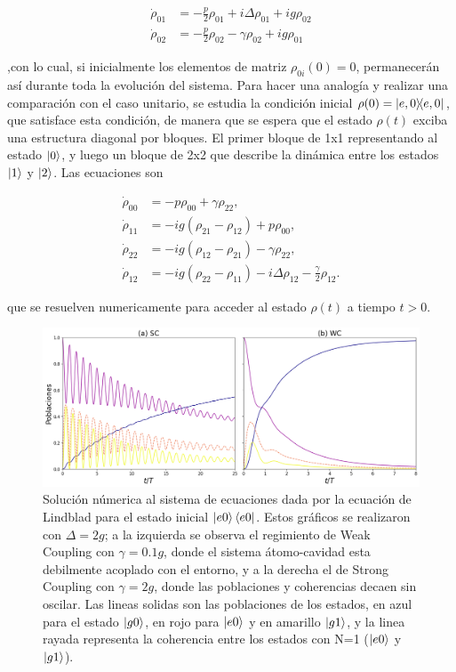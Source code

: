 \begin{equation}
    \begin{aligned}
        \dot \rho_{01} & =-\frac{p}{2} \rho_{01}+i\Delta\rho_{01}+ig\rho_{02} \\
        \dot \rho_{02} & =-\frac{p}{2} \rho_{02}-\gamma \rho_{02}+ig\rho_{01}
    \end{aligned}
\end{equation}

,con lo cual, si inicialmente los elementos de matriz $\rho_{0i}(0)=0$, permanecerán así durante toda la evolución del sistema. Para hacer una analogía y realizar una comparación con el caso unitario, se estudia la condición inicial $\rho(0)=\ketbra{e,0}{e,0}$, que satisface esta condición, de manera que se espera que el estado $\rho(t)$ exciba una estructura diagonal por bloques. El primer bloque de 1x1 representando al estado $\ket{0}$, y luego un bloque de 2x2 que describe la dinámica entre los estados $\ket{1}$ y $\ket{2}$. Las ecuaciones son

\begin{equation}
\begin{aligned}
\dot{\rho}_{00} &= -p \rho_{00} + \gamma \rho_{22}, \\
\dot{\rho}_{11} &= -i g (\rho_{21} - \rho_{12}) + p \rho_{00}, \\
\dot{\rho}_{22} &= -i g (\rho_{12} - \rho_{21}) - \gamma \rho_{22}, \\
\dot{\rho}_{12} &= -i g (\rho_{22} - \rho_{11}) - i \Delta \rho_{12} - \frac{\gamma}{2} \rho_{12}.
\end{aligned}
\end{equation}

que se resuelven numericamente para acceder al estado $\rho(t)$ a tiempo $t>0$. 

\begin{figure}[H]
    \centering
    \includegraphics[width=\textwidth]{figuras/ch3/poblaciones sc vs wc.png}
    \caption{Solución númerica al sistema de ecuaciones dada por la ecuación de Lindblad para el estado inicial $\ket{e0}\bra{e0}$. Estos gráficos se realizaron con $\Delta=2g$; a la izquierda se observa el regimiento de Weak Coupling con $\gamma=0.1g$, donde el sistema átomo-cavidad esta debilmente acoplado con el entorno, y a la derecha el de Strong Coupling con $\gamma=2g$, donde las poblaciones y coherencias decaen sin oscilar. Las lineas solidas son las poblaciones de los estados, en azul para el estado $\ket{g0}$, en rojo para $\ket{e0}$ y en amarillo $\ket{g1}$, y la linea rayada representa la coherencia entre los estados con N=1 ($\ket{e0}$ y $\ket{g1}$). }
    \label{fig3:poblaciones e0}
\end{figure}

